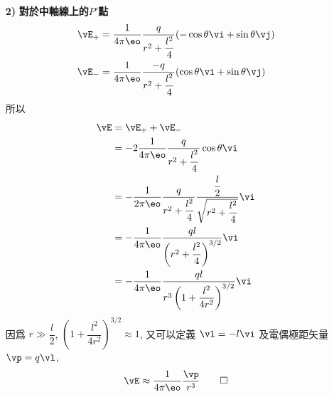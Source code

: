 \begin{solve}
\begin{itemize}
        \item[\textbf{2)}]\textbf{對於中軸線上的$P'$點}
              \begin{align*}
                  \vE_+ & = \frac{1}{4\pi\eo}\frac{q}{r^2 + \dfrac{l^2}{4}}(-\cos \theta \vi + \sin \theta \vj) \\
                  \vE_- & = \frac{1}{4\pi\eo}\frac{-q}{r^2 + \dfrac{l^2}{4}}(\cos \theta \vi + \sin \theta \vj)
              \end{align*}
              所以
              \begin{align*}
                  \vE & = \vE_{+} + \vE_{-}                                                                                    \\
                      & = -2\frac{1}{4\pi\eo}\frac{q}{r^2 + \dfrac{l^2}{4}}\cos\theta \vi                                      \\
                      & = -\frac{1}{2\pi\eo}\frac{q}{r^2 + \dfrac{l^2}{4}}\frac{\dfrac{l}{2}}{\sqrt{r^2 + \dfrac{l^2}{4}}} \vi \\
                      & = -\frac{1}{4\pi\eo}\frac{ql}{\left(r^2 + \dfrac{l^2}{4}\right)^{3/2}} \vi                             \\
                      & = -\frac{1}{4\pi\eo}\frac{ql}{r^3\left(1 + \dfrac{l^2}{4r^2}\right)^{3/2}} \vi
              \end{align*}
              因爲 $r \gg \dfrac{l}{2}$, $\left(1 + \dfrac{l^2}{4r^2}\right)^{3/2} \approx 1$, 又可以定義 $\vl = -l\vi$ 及電偶極距矢量 $\vp = q\vl$,
              \begin{equation*}
                  \vE \approx \frac{1}{4\pi\eo}\frac{\vp}{r^3} \qedhere
              \end{equation*}
    \end{itemize}
\end{solve}